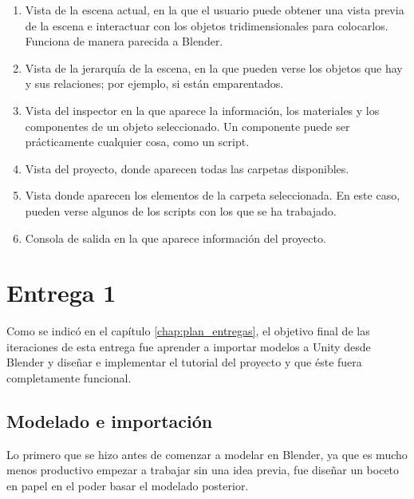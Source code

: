 \begin{enumerate}
    \item Vista de la escena actual, en la que el usuario puede obtener una vista previa de la escena e interactuar con los objetos tridimensionales para colocarlos. Funciona de manera parecida a Blender.
    
    \item Vista de la jerarquía de la escena, en la que pueden verse los objetos que hay y sus relaciones; por ejemplo, si están emparentados.
    
    \item Vista del inspector en la que aparece la información, los materiales y los componentes de un objeto seleccionado. Un componente puede ser prácticamente cualquier cosa, como un script.
    
    \item Vista del proyecto, donde aparecen todas las carpetas disponibles.
    
    \item Vista donde aparecen los elementos de la carpeta seleccionada. En este caso, pueden verse algunos de los scripts con los que se ha trabajado.
    
    \item Consola de salida en la que aparece información del proyecto.
\end{enumerate}

\section{Entrega 1}

Como se indicó en el capítulo \ref{chap:plan_entregas}, el objetivo final de las iteraciones de esta entrega fue aprender a importar modelos a Unity desde Blender y diseñar e implementar el tutorial del proyecto y que éste fuera completamente funcional. 

\subsection{Modelado e importación}

Lo primero que se hizo antes de comenzar a modelar en Blender, ya que es mucho menos productivo empezar a trabajar sin una idea previa, fue diseñar un boceto en papel en el poder basar el modelado posterior.

